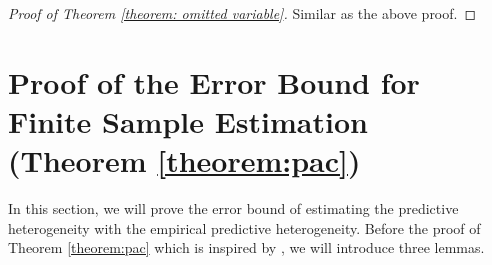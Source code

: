 \begin{proof}[Proof of Theorem \ref{theorem: omitted variable}]
	Similar as the above proof.	
\end{proof}



\section{Proof of the Error Bound for Finite Sample Estimation (Theorem \ref{theorem:pac})}
\label{proof: pac}

In this section, we will prove the error bound of estimating the predictive heterogeneity with the empirical predictive heterogeneity. Before the proof of Theorem \ref{theorem:pac} which is inspired by \cite{DBLP:conf/iclr/XuZSSE20}, we will introduce three lemmas.

